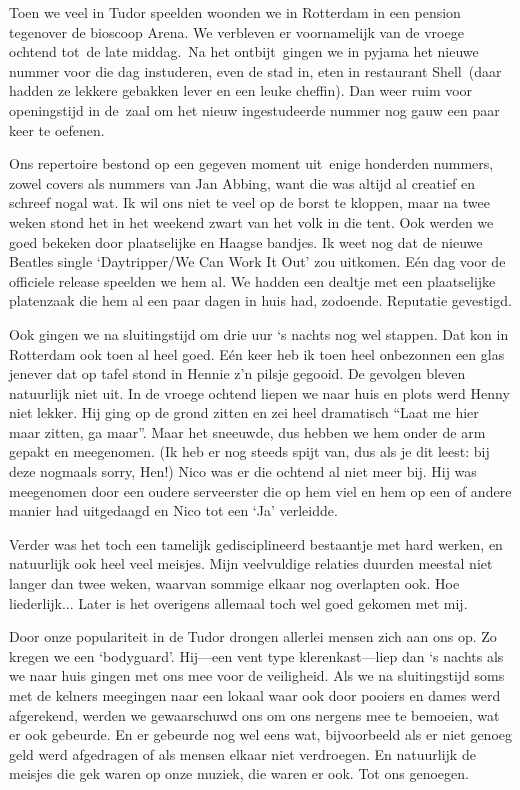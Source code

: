\documentclass[12pt,twoside]{memoir}
\begin{document}
Toen we veel in Tudor speelden woonden we in Rotterdam in een pension tegenover de bioscoop Arena. We verbleven er voornamelijk van de vroege ochtend tot de late middag. Na het ontbijt gingen we in pyjama het nieuwe nummer voor die dag instuderen, even de stad in, eten in restaurant Shell (daar hadden ze lekkere gebakken lever en een leuke cheffin). Dan weer ruim voor openingstijd in de zaal om het nieuw ingestudeerde nummer nog gauw een paar keer te oefenen. 

Ons repertoire bestond op een gegeven moment uit enige honderden nummers, zowel covers als nummers van Jan Abbing, want die was altijd al creatief en schreef nogal wat. Ik wil ons niet te veel op de borst te kloppen, maar na twee weken stond het in het weekend zwart van het volk in die tent. Ook werden we goed bekeken door plaatselijke en Haagse bandjes. Ik weet nog dat de nieuwe Beatles single `Daytripper/We Can Work It Out' zou uitkomen. Eén dag voor de officiele release speelden we hem al. We hadden een dealtje met een plaatselijke platenzaak die hem al een paar dagen in huis had, zodoende. Reputatie gevestigd. 

Ook gingen we na sluitingstijd om drie uur `s nachts nog wel stappen. Dat kon in Rotterdam ook toen al heel goed. Eén keer heb ik toen heel onbezonnen een glas jenever dat op tafel stond in Hennie z'n pilsje gegooid. De gevolgen bleven natuurlijk niet uit. In de vroege ochtend liepen we naar huis en plots werd Henny niet lekker. Hij ging op de grond zitten en zei heel dramatisch ``Laat me hier maar zitten, ga maar''. Maar het sneeuwde, dus hebben we hem onder de arm gepakt en meegenomen. (Ik heb er nog steeds spijt van, dus als je dit leest: bij deze nogmaals sorry, Hen!) Nico was er die ochtend al niet meer bij. Hij was meegenomen door een oudere serveerster die op hem viel en hem op een of andere manier had uitgedaagd en Nico tot een `Ja' verleidde.

Verder was het toch een tamelijk gedisciplineerd bestaantje met hard werken, en natuurlijk ook heel veel meisjes. Mijn veelvuldige relaties duurden meestal niet langer dan twee weken, waarvan sommige elkaar nog overlapten ook. Hoe liederlijk... Later is het overigens allemaal toch wel goed gekomen met mij. 

Door onze populariteit in de Tudor drongen allerlei mensen zich aan ons op. Zo kregen we een `bodyguard'. Hij---een vent type klerenkast---liep dan `s nachts als we naar huis gingen met ons mee voor de veiligheid. Als we na sluitingstijd soms met de kelners meegingen naar een lokaal waar ook door pooiers en dames werd afgerekend, werden we gewaarschuwd ons om ons nergens mee te bemoeien, wat er ook gebeurde. En er gebeurde nog wel eens wat, bijvoorbeeld als er niet genoeg geld werd afgedragen of als mensen elkaar niet verdroegen. En natuurlijk de meisjes die gek waren op onze muziek, die waren er ook. Tot ons genoegen. 
\end{document}
